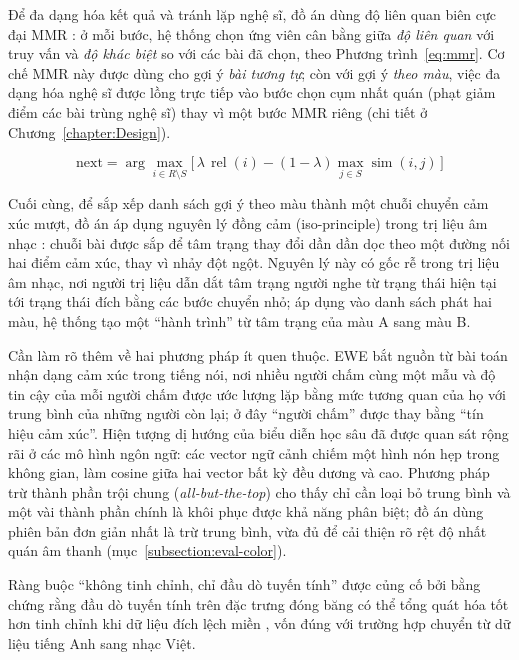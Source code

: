 \documentclass[../DoAn.tex]{subfiles}
\begin{document}
Để đa dạng hóa kết quả và tránh lặp nghệ sĩ, đồ án dùng độ liên quan biên cực đại MMR \cite{carbonell1998mmr}: ở mỗi bước, hệ thống chọn ứng viên cân bằng giữa \textit{độ liên quan} với truy vấn và \textit{độ khác biệt} so với các bài đã chọn, theo Phương trình~\eqref{eq:mmr}. Cơ chế MMR này được dùng cho gợi ý \textit{bài tương tự}; còn với gợi ý \textit{theo màu}, việc đa dạng hóa nghệ sĩ được lồng trực tiếp vào bước chọn cụm nhất quán (phạt giảm điểm các bài trùng nghệ sĩ) thay vì một bước MMR riêng (chi tiết ở Chương~\ref{chapter:Design}).

\begin{equation}\label{eq:mmr}
  \text{next} = \arg\max_{i \in R \setminus S}\Big[\,\lambda\,\operatorname{rel}(i) - (1-\lambda)\max_{j \in S}\operatorname{sim}(i,j)\,\Big]
\end{equation}

Cuối cùng, để sắp xếp danh sách gợi ý theo màu thành một chuỗi chuyển cảm xúc mượt, đồ án áp dụng nguyên lý đồng cảm (iso-principle) trong trị liệu âm nhạc \cite{altshuler1948iso, starcke2021iso}: chuỗi bài được sắp để tâm trạng thay đổi dần dần dọc theo một đường nối hai điểm cảm xúc, thay vì nhảy đột ngột. Nguyên lý này có gốc rễ trong trị liệu âm nhạc, nơi người trị liệu dẫn dắt tâm trạng người nghe từ trạng thái hiện tại tới trạng thái đích bằng các bước chuyển nhỏ; áp dụng vào danh sách phát hai màu, hệ thống tạo một ``hành trình'' từ tâm trạng của màu A sang màu B.

Cần làm rõ thêm về hai phương pháp ít quen thuộc. EWE \cite{grimm2005ewe} bắt nguồn từ bài toán nhận dạng cảm xúc trong tiếng nói, nơi nhiều người chấm cùng một mẫu và độ tin cậy của mỗi người chấm được ước lượng lặp bằng mức tương quan của họ với trung bình của những người còn lại; ở đây ``người chấm'' được thay bằng ``tín hiệu cảm xúc''. Hiện tượng dị hướng của biểu diễn học sâu \cite{ethayarajh2019anisotropy} đã được quan sát rộng rãi ở các mô hình ngôn ngữ: các vector ngữ cảnh chiếm một hình nón hẹp trong không gian, làm cosine giữa hai vector bất kỳ đều dương và cao. Phương pháp trừ thành phần trội chung (\textit{all-but-the-top}) \cite{mu2018allbutthetop} cho thấy chỉ cần loại bỏ trung bình và một vài thành phần chính là khôi phục được khả năng phân biệt; đồ án dùng phiên bản đơn giản nhất là trừ trung bình, vừa đủ để cải thiện rõ rệt độ nhất quán âm thanh (mục~\ref{subsection:eval-color}).

Ràng buộc ``không tinh chỉnh, chỉ đầu dò tuyến tính'' được củng cố bởi bằng chứng rằng đầu dò tuyến tính trên đặc trưng đóng băng có thể tổng quát hóa tốt hơn tinh chỉnh khi dữ liệu đích lệch miền \cite{kumar2022finetuning}, vốn đúng với trường hợp chuyển từ dữ liệu tiếng Anh sang nhạc Việt.
\end{document}
